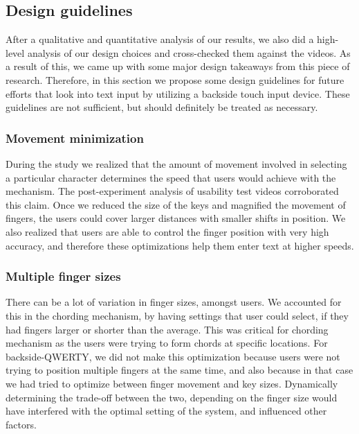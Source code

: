 \subsection{Design guidelines}

After a qualitative and quantitative analysis of our results, we also
did a high-level analysis of our design choices and cross-checked them
against the videos. As a result of this, we came up with some major
design takeaways from this piece of research. Therefore, in this
section we propose some design guidelines for future efforts that look
into text input by utilizing a backside touch input device. These
guidelines are not sufficient, but should definitely be treated as
necessary.

\subsubsection{Movement minimization}

During the study we realized that the amount of movement involved in
selecting a particular character determines the speed that users would
achieve with the mechanism. The post-experiment analysis of usability
test videos corroborated this claim. Once we reduced the size of the
keys and magnified the movement of fingers, the users could cover
larger distances with smaller shifts in position. We also realized
that users are able to control the finger position with very high
accuracy, and therefore these optimizations help them enter text at
higher speeds.

\subsubsection{Multiple finger sizes}

There can be a lot of variation in finger sizes, amongst users. We
accounted for this in the chording mechanism, by having settings that
user could select, if they had fingers larger or shorter than the
average. This was critical for chording mechanism as the users were
trying to form chords at specific locations. For backside-QWERTY, we
did not make this optimization because users were not trying to
position multiple fingers at the same time, and also because in that
case we had tried to optimize between finger movement and key
sizes. Dynamically determining the trade-off between the two,
depending on the finger size would have interfered with the optimal
setting of the system, and influenced other factors.

